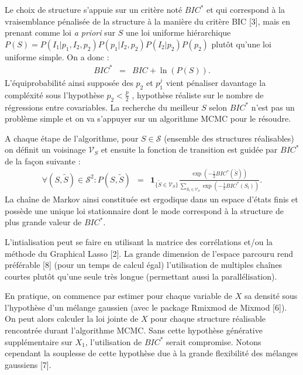 \documentclass[12pt]{article}
\begin{document}
		Le choix de structure s'appuie sur un critère noté $BIC^*$ et qui correspond à la vraisemblance pénalisée de la structure à la manière du critère BIC [3], mais en prenant comme loi {\it a priori} sur $S$ une loi uniforme hiérarchique $P(S)=P(I_1 | p_1,I_2,p_2)P(p_1|I_2,p_2)P(I_2|p_2)P(p_2)$ plutôt qu'une loi uniforme simple. On a donc :
		\begin{eqnarray}
		BIC^*&=&BIC +\ln(P(S)) \label{Bicstar} .
	\end{eqnarray}	
	L'équiprobabilité ainsi supposée des $p_2$ et $p_1^j$ vient pénaliser davantage la compléxité sous l'hypothèse $p_2<\frac{p}{2}$ , hypothèse réaliste sur le nombre de régressions entre covariables. La recherche du meilleur $S$ selon $BIC^*$ n'est pas un problème simple et on va s'appuyer sur un algorithme MCMC pour le résoudre.

	A chaque étape de l'algorithme, pour $S \in \mathcal{S}$ (ensemble des structures réalisables) on définit un voisinage $\mathcal{V}_{S}$ %
		et ensuite la fonction de transition est guidée par $BIC^*$ de la façon suivante :	
	\begin{eqnarray}
			\forall (S,\tilde{S}) \in \mathcal{S}^2 : P(S,\tilde{S})&=& \mathbf{1}_{ \{\tilde{S}\in \mathcal{V}_{S}\} }\frac{\exp(-\frac{1}{2} BIC^*(\tilde{S}))}{\sum_{S_l\in \mathcal{V}_{S}}\exp(-\frac{1}{2} BIC^*(S_l))}.
	\end{eqnarray}
La chaîne de Markov ainsi constituée est ergodique dans un espace d'états finis et possède une unique loi stationnaire dont le mode correspond à la structure de plus grande valeur de $BIC^*$.
 
L'intialisation peut se faire en utilisant la matrice des corrélations et/ou la méthode du Graphical Lasso [2].		
La grande dimension de l'espace parcouru rend préférable [8]  (pour un temps de calcul égal) l'utilisation de multiples chaînes courtes  plutôt qu'une seule très longue (permettant aussi la parallélisation).
	
	En pratique, on commence par estimer pour chaque variable de $X$ sa densité sous l'hypothèse d'un mélange gaussien (avec le package Rmixmod de Mixmod [6]). On peut alors calculer la loi jointe de $X$ pour chaque structure réalisable rencontrée durant l'algorithme MCMC. Sans cette hypothèse générative supplémentaire sur $X_1$, l'utilisation de $BIC^*$ serait compromise. Notons cependant la souplesse de cette hypothèse due à la grande flexibilité des mélanges gaussiens [7].
\end{document}
